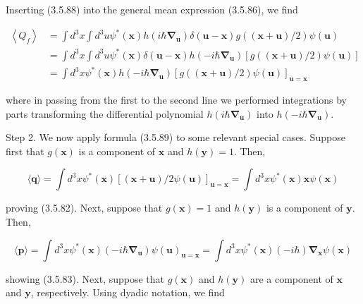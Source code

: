 \documentclass{article}
\begin{document}
Inserting (3.5.88) into the general mean expression (3.5.86), we find
 
\begin{align*}
\left\langle Q_{f}\right\rangle & =\int d^{3} x \int d^{3} u \psi^{*}(\boldsymbol{x}) h\left(i \hbar \boldsymbol{\nabla}_{\boldsymbol{u}}\right) \delta(\boldsymbol{u}-\boldsymbol{x}) g((\boldsymbol{x}+\boldsymbol{u}) / 2) \psi(\boldsymbol{u})  \tag{3.5.89}\\
& =\int d^{3} x \int d^{3} u \psi^{*}(\boldsymbol{x}) \delta(\boldsymbol{u}-\boldsymbol{x}) h\left(-i \hbar \boldsymbol{\nabla}_{\boldsymbol{u}}\right)[g((\boldsymbol{x}+\boldsymbol{u}) / 2) \psi(\boldsymbol{u})] \\
& =\int d^{3} x \psi^{*}(\boldsymbol{x}) h\left(-i \hbar \boldsymbol{\nabla}_{\boldsymbol{u}}\right)[g((\boldsymbol{x}+\boldsymbol{u}) / 2) \psi(\boldsymbol{u})]_{\boldsymbol{u}=\boldsymbol{x}}
\end{align*}
 
where in passing from the first to the second line we performed integrations by parts transforming the differential polynomial $h\left(i \hbar \boldsymbol{\nabla}_{\boldsymbol{u}}\right)$ into $h\left(-i \hbar \boldsymbol{\nabla}_{\boldsymbol{u}}\right)$.

Step 2. We now apply formula (3.5.89) to some relevant special cases. Suppose first that $g(\boldsymbol{x})$ is a component of $\boldsymbol{x}$ and $h(\boldsymbol{y})=1$. Then,
 
\begin{equation*}
\langle\boldsymbol{q}\rangle=\int d^{3} x \psi^{*}(\boldsymbol{x})[(\boldsymbol{x}+\boldsymbol{u}) / 2 \psi(\boldsymbol{u})]_{\boldsymbol{u}=\boldsymbol{x}}=\int d^{3} x \psi^{*}(\boldsymbol{x}) \boldsymbol{x} \psi(\boldsymbol{x}) \tag{3.5.90}
\end{equation*}
 
proving (3.5.82). Next, suppose that $g(\boldsymbol{x})=1$ and $h(\boldsymbol{y})$ is a component of $\boldsymbol{y}$. Then,
 
\begin{equation*}
\langle\boldsymbol{p}\rangle=\int d^{3} x \psi^{*}(\boldsymbol{x})\left(-i \hbar \boldsymbol{\nabla}_{\boldsymbol{u}}\right) \psi(\boldsymbol{u})_{\boldsymbol{u}=\boldsymbol{x}}=\int d^{3} x \psi^{*}(\boldsymbol{x})(-i \hbar) \boldsymbol{\nabla}_{\boldsymbol{x}} \psi(\boldsymbol{x}) \tag{3.5.91}
\end{equation*}
 
showing (3.5.83). Next, suppose that $g(\boldsymbol{x})$ and $h(\boldsymbol{y})$ are a component of $\boldsymbol{x}$ and $\boldsymbol{y}$, respectively. Using dyadic notation, we find
 
\end{document}
